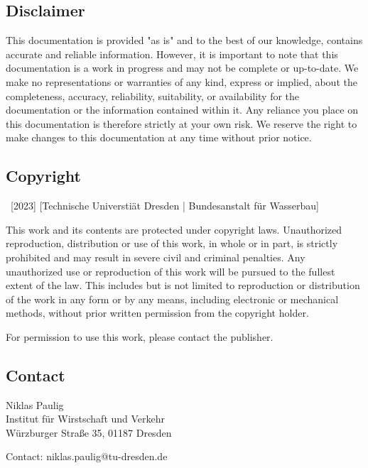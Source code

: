 \documentclass[
	a4paper, %
	12pt, %
]{persist}
\begin{document}
\begin{twothirdswidth} %
	\footnotesize %
	
	\subsection*{Disclaimer}

	This documentation is provided "as is" and to the best of our knowledge, contains accurate and reliable information. However, it is important to note that this documentation is a work in progress and may not be complete or up-to-date. We make no representations or warranties of any kind, express or implied, about the completeness, accuracy, reliability, suitability, or availability for the documentation or the information contained within it. Any reliance you place on this documentation is therefore strictly at your own risk. We reserve the right to make changes to this documentation at any time without prior notice.
	
	\subsection*{Copyright}
	
	\textcopyright~[2023] [Technische Universtiät Dresden | Bundesanstalt für Wasserbau] 
	
	This work and its contents are protected under copyright laws. Unauthorized reproduction, distribution or use of this work, in whole or in part, is strictly prohibited and may result in severe civil and criminal penalties. Any unauthorized use or reproduction of this work will be pursued to the fullest extent of the law. This includes but is not limited to reproduction or distribution of the work in any form or by any means, including electronic or mechanical methods, without prior written permission from the copyright holder.

	For permission to use this work, please contact the publisher.
	
	\subsection*{Contact}
	
	Niklas Paulig\\
	Institut für Wirstschaft und Verkehr\\
	Würzburger Straße 35, 01187 Dresden
	
	Contact: niklas.paulig@tu-dresden.de
	

\end{twothirdswidth}
\end{document}
